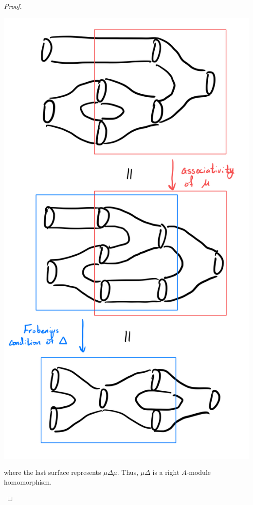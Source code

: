 \documentclass[ 12pt ]{article}
\begin{document}
\begin{enumerate}
\begin{proof}
\begin{enumerate}
\begin{center}
				\includegraphics[scale=0.2]{Equality}
				\end{center}
				where the last surface represents $\mu \Delta \mu$. Thus, $\mu \Delta$ is a right $A$-module homomorphism.


\end{enumerate}
\end{proof}
\end{enumerate}
\end{document}
